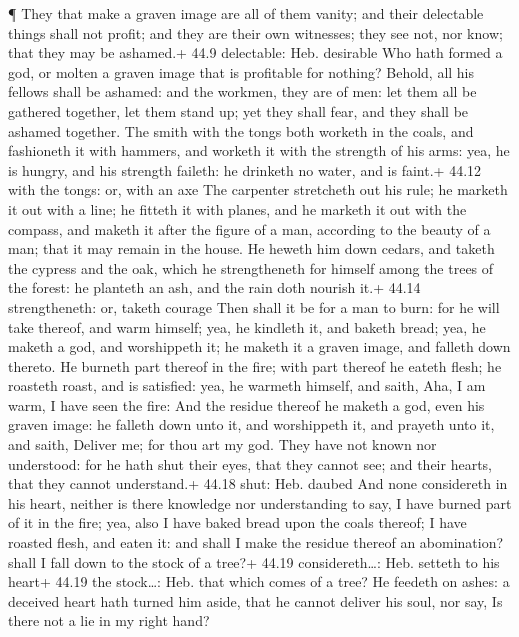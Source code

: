  ¶ They that make a graven image are all of them vanity; and
their delectable things shall not profit; and they are their own
witnesses; they see not, nor know; that they may be ashamed.+ 44.9
delectable: Heb. desirable  Who hath formed a god, or
molten a graven image that is profitable for nothing? 
Behold, all his fellows shall be ashamed: and the workmen, they are of
men: let them all be gathered together, let them stand up; yet they
shall fear, and they shall be ashamed together.  The smith
with the tongs both worketh in the coals, and fashioneth it with
hammers, and worketh it with the strength of his arms: yea, he is
hungry, and his strength faileth: he drinketh no water, and is faint.+
44.12 with the tongs: or, with an axe  The carpenter
stretcheth out his rule; he marketh it out with a line; he fitteth it
with planes, and he marketh it out with the compass, and maketh it after
the figure of a man, according to the beauty of a man; that it may
remain in the house.  He heweth him down cedars, and taketh
the cypress and the oak, which he strengtheneth for himself among the
trees of the forest: he planteth an ash, and the rain doth nourish it.+
44.14 strengtheneth: or, taketh courage  Then shall it be
for a man to burn: for he will take thereof, and warm himself; yea, he
kindleth it, and baketh bread; yea, he maketh a god, and worshippeth it;
he maketh it a graven image, and falleth down thereto.  He
burneth part thereof in the fire; with part thereof he eateth flesh; he
roasteth roast, and is satisfied: yea, he warmeth himself, and saith,
Aha, I am warm, I have seen the fire:  And the residue
thereof he maketh a god, even his graven image: he falleth down unto it,
and worshippeth it, and prayeth unto it, and saith, Deliver me; for thou
art my god.  They have not known nor understood: for he
hath shut their eyes, that they cannot see; and their hearts, that they
cannot understand.+ 44.18 shut: Heb. daubed  And none
considereth in his heart, neither is there knowledge nor understanding
to say, I have burned part of it in the fire; yea, also I have baked
bread upon the coals thereof; I have roasted flesh, and eaten it: and
shall I make the residue thereof an abomination? shall I fall down to
the stock of a tree?+ 44.19 considereth\ldots: Heb. setteth to his
heart+ 44.19 the stock\ldots: Heb. that which comes of a tree?
 He feedeth on ashes: a deceived heart hath turned him
aside, that he cannot deliver his soul, nor say, Is there not a lie in
my right hand?

